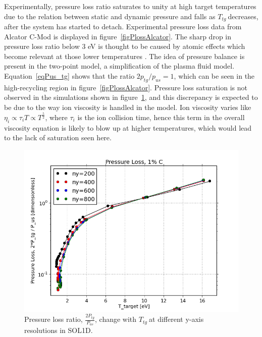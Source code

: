 \documentclass[12pt]{article}  %
\providecommand{\Ttg}{$T_{tg}~$} %
\begin{document}
Experimentally, pressure loss ratio saturates to unity at high target temperatures due to the relation between static and dynamic pressure and falls as \Ttg decreases, after the system has started to detach. Experimental pressure loss data from Alcator C-Mod is displayed in figure~\ref{figPlossAlcator}. The sharp drop in pressure loss ratio below 3 eV is thought to be caused by atomic effects which become relevant at those lower temperatures \cite{Pitcher1999}. The idea of pressure balance is present in the two-point model, a simplification of the plasma fluid model. Equation~\ref{eqPus_tg} shows that the ratio $2p_{tg}/p_{us} = 1$, which can be seen in the high-recycling region in figure~\ref{figPlossAlcator}. Pressure loss saturation is not observed in the simulations shown in figure~\ref{figPL_IMPCOMBO2logy}, and this discrepancy is expected to be due to the way ion viscosity is handled in the model. Ion viscosity varies like $\eta_i \propto \tau_i T \propto T^{\frac{5}{2}}$, where $\tau_i$ is the ion collision time, hence this term in the overall viscosity equation is likely to blow up at higher temperatures, which would lead to the lack of saturation seen here. 

\begin{figure}
\includegraphics[scale=0.7]{Figures/sol1d/PL_IMPCOMBO2logy.png}
\centering
\caption{Pressure loss ratio, $\frac{2P_{tg}}{P_{us}}$, change with \Ttg at different y-axis resolutions in SOL1D.}\label{figPL_IMPCOMBO2logy}
\end{figure}
\end{document}
